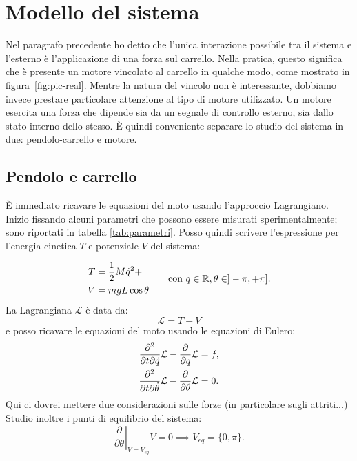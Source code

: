 \section{Modello del sistema}
Nel paragrafo precedente ho detto che l'unica interazione possibile tra il sistema
e l'esterno è l'applicazione di una forza sul carrello.
Nella pratica, questo significa che è presente un motore vincolato al carrello
in qualche modo, come mostrato in figura~\ref{fig:pic-real}.
Mentre la natura del vincolo non è interessante, dobbiamo invece prestare
particolare attenzione al tipo di motore utilizzato.
Un motore esercita una forza che dipende sia da un segnale di controllo esterno,
sia dallo stato interno dello stesso.
È quindi conveniente separare lo studio del sistema in due:
pendolo-carrello e motore.

\subsection{Pendolo e carrello}
È immediato ricavare le equazioni del moto usando l'approccio Lagrangiano. Inizio fissando alcuni parametri che possono essere misurati sperimentalmente; sono riportati in tabella \ref{tab:parametri}. Posso quindi scrivere l'espressione per l'energia cinetica $T$ e potenziale $V$ del sistema:

\begin{equation*}
    \begin{aligned}
        T &= \frac 1 2 M  \dot q^2 +  \\ %
        V &= mgL \cos\theta
    \end{aligned}
    \hspace{20pt} \text{con } q \in \R, \theta \in ]-\pi, +\pi].
    \label{eq:energy}
\end{equation*}
La Lagrangiana $\mathcal L$ è data da:
\begin{equation*}
    \mathcal L = T - V
\end{equation*}
e posso ricavare le equazioni del moto usando le equazioni di Eulero:
\begin{equation*}
    \begin{aligned}
        \frac{\partial^2}{\partial t \partial \dot q} \mathcal L - \frac \partial {\partial q} \mathcal L &= f, \\
        \frac{\partial^2}{\partial t \partial \dot \theta} \mathcal L  - \frac \partial {\partial \theta} \mathcal L &= 0.
    \end{aligned}
    \label{eq:moto-sistema}
\end{equation*}
Qui ci dovrei mettere due considerazioni sulle forze (in particolare sugli attriti...)
Studio inoltre i punti di equilibrio del sistema:
\begin{equation*}
    \left. \frac \partial {\partial \theta}\right |_{V=V_{eq}} V =  0 \implies V_{eq} = \{0, \pi\}.
\end{equation*}


